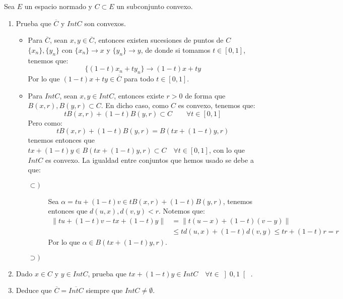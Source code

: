 \begin{ejercicio}
    Sea $E$ un espacio normado y $C\subset E$ un subconjunto convexo.
    \begin{enumerate}[label=\alph*)]
        \item Prueba que $\overline{C}$ y $Int C$ son convexos.

            \begin{itemize}
                \item Para $\overline{C}$, sean $x,y\in \overline{C}$, entonces existen sucesiones de puntos de $C$ $\{x_n\},\{y_n\}$ con $\{x_n\}\to x$ y $\{y_n\}\to y$, de donde si tomamos $t\in [0,1]$, tenemos que:
                    \begin{equation*}
                        \{(1-t)x_n + ty_n\} \to (1-t)x+ty
                    \end{equation*}
                    Por lo que $(1-t)x+ty\in \overline{C}$ para todo $t\in [0,1]$.
                \item Para $Int C$, sean $x,y\in Int C$, entonces existe $r>0$ de forma que $B(x,r),B(y,r)\subset C$. En dicho caso, como $C$ es convexo, tenemos que:
                    \begin{equation*}
                        tB(x,r) + (1-t)B(y,r) \subset C \qquad \forall t\in [0,1]
                    \end{equation*}
                    Pero como:
                    \begin{equation*}
                        tB(x,r) + (1-t)B(y,r) = B(tx+(1-t)y,r)
                    \end{equation*}
                    tenemos entonces que $tx + (1-t)y \in B(tx+(1-t)y,r)\subset C\quad \forall t\in [0,1]$, con lo que $Int C$ es convexo. La igualdad entre conjuntos que hemos usado se debe a que:
                    \begin{description}
                        \item [$\subset)$] Sea $\alpha=tu+(1-t)v\in tB(x,r)+(1-t)B(y,r)$, tenemos entonces que $d(u,x),d(v,y)<r$. Notemos que:
                            \begin{align*}
                                \|tu+(1-t)v - tx+(1-t)y\| &= \|t(u-x)+(1-t)(v-y)\| \\ 
                                &\leq td(u,x) + (1-t)d(v,y) \leq tr + (1-t)r = r
                            \end{align*}
                            Por lo que $\alpha\in B(tx+(1-t)y,r)$.
                        \item [$\supset)$]  %
                    \end{description}
            \end{itemize}
        \item Dado $x\in C$ y $y\in Int C$, prueba que $tx+(1-t)y\in Int C\quad \forall t\in \left]0,1\right[$ . %
        \item Deduce que $\overline{C} = \overline{Int C}$ siempre que $Int C\neq \emptyset $.
    \end{enumerate}
\end{ejercicio}

